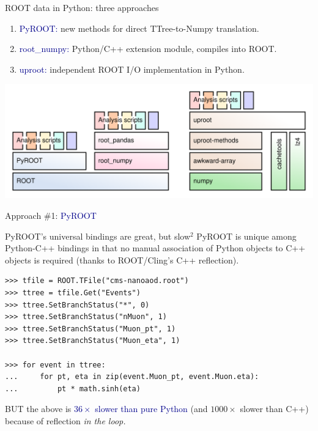 \documentclass[aspectratio=169]{beamer}
\begin{document}
\begin{frame}{ROOT data in Python: three approaches}
\vspace{0.3 cm}
\large
\begin{enumerate}
\item \textcolor{darkblue}{PyROOT:} new methods for direct TTree-to-Numpy translation.
\item \textcolor{darkblue}{root\_numpy:} Python/C++ extension module, compiles into ROOT.
\item \textcolor{darkblue}{uproot:} independent ROOT I/O implementation in Python.
\end{enumerate}

\vspace{0.2 cm}
\includegraphics[width=\linewidth]{abstraction-layers.png}
\end{frame}

\begin{frame}{}
\LARGE
\begin{center}
Approach \#1: \textcolor{darkblue}{PyROOT}
\end{center}
\end{frame}

\begin{frame}[fragile]{PyROOT's universal bindings are great, but slow$^2$}
\vspace{0.5 cm}
PyROOT is unique among Python-C++ bindings in that no manual association of Python objects to C++ objects is required (thanks to ROOT/Cling's C++ reflection).

\vspace{0.25 cm}
\small
\begin{verbatim}
>>> tfile = ROOT.TFile("cms-nanoaod.root")
>>> ttree = tfile.Get("Events")
>>> ttree.SetBranchStatus("*", 0)
>>> ttree.SetBranchStatus("nMuon", 1)
>>> ttree.SetBranchStatus("Muon_pt", 1)
>>> ttree.SetBranchStatus("Muon_eta", 1)

>>> for event in ttree:
...     for pt, eta in zip(event.Muon_pt, event.Muon.eta):
...         pt * math.sinh(eta)
\end{verbatim}
\large

\vspace{0.25 cm}
BUT the above is \textcolor{darkblue}{$36\times$ slower than pure Python} (and $1000\times$ slower than C++) because of reflection {\it in the loop.}
\end{frame}
\end{document}

